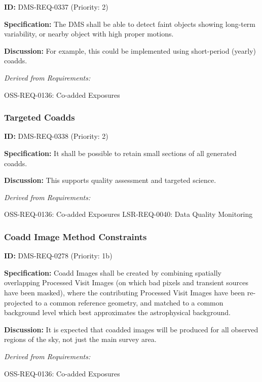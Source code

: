 \documentclass[SE,toc,lsstdraft]{lsstdoc}
\begin{document}
\label{DMS-REQ-0337}
\textbf{ID:} DMS-REQ-0337 (Priority: 2)

\textbf{Specification: }The DMS shall be able to detect faint objects showing long-term variability, or nearby object with high proper motions.

\textbf{Discussion:} For example, this could be implemented using short-period (yearly) coadds.

\emph{Derived from Requirements:}

OSS-REQ-0136:
Co-added Exposures \newline

\subsubsection{Targeted Coadds}

\label{DMS-REQ-0338}
\textbf{ID:} DMS-REQ-0338 (Priority: 2)

\textbf{Specification:} It shall be possible to retain small sections of all generated coadds.

\textbf{Discussion:} This supports quality assessment and targeted science.

\emph{Derived from Requirements:}

OSS-REQ-0136:
Co-added Exposures \newline
LSR-REQ-0040:
Data Quality Monitoring \newline

\subsubsection{Coadd Image Method Constraints}

\label{DMS-REQ-0278}
\textbf{ID:} DMS-REQ-0278 (Priority: 1b)

\textbf{Specification:} Coadd Images shall be created by combining spatially overlapping Processed Visit Images (on which bad pixels and transient sources have been masked), where the contributing Processed Visit Images have been re-projected to a common reference geometry, and matched to a common background level which best approximates the astrophysical background.

\textbf{Discussion:} It is expected that coadded images will be produced for all observed regions of the sky, not just the main survey area.

\emph{Derived from Requirements:}

OSS-REQ-0136:
Co-added Exposures \newline
\end{document}
